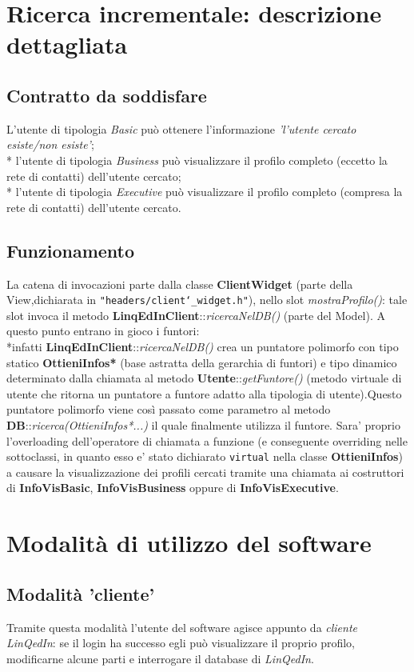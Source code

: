 \documentclass{article}
\begin{document}
\section{Ricerca incrementale: descrizione dettagliata}   %
\subsection{Contratto da soddisfare}
L'utente di tipologia \textit{Basic} può ottenere l'informazione \textit{'l'utente cercato esiste/non esiste'};\\*
l'utente di tipologia \textit{Business} può visualizzare il profilo completo (eccetto la rete di contatti) dell'utente cercato;\\*
l'utente di tipologia \textit{Executive} può visualizzare il profilo completo (compresa la rete di contatti) dell'utente cercato.
\subsection{Funzionamento}	%
La catena di invocazioni parte dalla classe \textbf{ClientWidget} (parte della View,dichiarata in \texttt{"headers/client\char`_widget.h"}), nello slot \textit{mostraProfilo()}:
tale slot invoca il metodo \textbf{LinqEdInClient}::\textit{ricercaNelDB()} (parte del Model). A questo punto entrano in gioco
i funtori:\\*infatti \textbf{LinqEdInClient}::\textit{ricercaNelDB()} crea un puntatore polimorfo con tipo statico \textbf{OttieniInfos*}
(base astratta della gerarchia di funtori) e tipo dinamico determinato dalla chiamata al metodo \textbf{Utente}::\textit{getFuntore()} (metodo virtuale di
utente che ritorna un puntatore a funtore adatto alla tipologia di utente).Questo puntatore polimorfo viene così passato come parametro 
al metodo \textbf{DB}::\textit{ricerca(OttieniInfos*...)} il quale finalmente utilizza il funtore.
Sara' proprio l'overloading dell'operatore di chiamata a funzione (e conseguente overriding nelle sottoclassi, in quanto esso e' stato dichiarato \texttt{virtual}
nella classe \textbf{OttieniInfos}) a causare la visualizzazione dei profili cercati tramite una chiamata ai costruttori di \textbf{InfoVisBasic}, \textbf{InfoVisBusiness} oppure di
\textbf{InfoVisExecutive}.

\section{Modalità di utilizzo del software}
\subsection {Modalità 'cliente'}
Tramite questa modalità l'utente del software agisce appunto da \textit{cliente LinQedIn}:
se il login ha successo egli può visualizzare il proprio profilo, modificarne alcune parti e interrogare il 
database di \textit{LinQedIn}.
\end{document}
